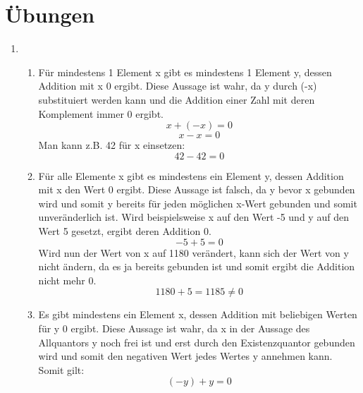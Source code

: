 \documentclass[a4paper]{article}
\begin{document}
	\section{Übungen}
	\begin{enumerate}
		\item
		\begin{enumerate}
			\item
			Für mindestens 1 Element x gibt es mindestens 1 Element y, dessen Addition mit x 0 ergibt.
			\newline
			Diese Aussage ist wahr, da y durch (-x) substituiert werden kann und die Addition einer Zahl mit deren Komplement immer 0 ergibt.
			\begin{equation*}
				x + (-x) = 0
			\end{equation*}
			\begin{equation*}
				x - x = 0
			\end{equation*}
			\newline
			Man kann z.B. 42 für x einsetzen:
			\begin{equation*}
				42 - 42 = 0
			\end{equation*}
			
			\item
			Für alle Elemente x gibt es mindestens ein Element y, dessen Addition mit x den Wert 0 ergibt.
			\newline
			Diese Aussage ist falsch, da y bevor x gebunden wird und somit y bereits für jeden möglichen x-Wert gebunden und somit unveränderlich ist.
			\newline
			Wird beispielsweise x auf den Wert -5 und y auf den Wert 5 gesetzt, ergibt deren Addition 0.
			\begin{equation*}
				-5 + 5 = 0
			\end{equation*}
			Wird nun der Wert von x auf 1180 verändert, kann sich der Wert von y nicht ändern, da es ja bereits gebunden ist und somit ergibt die Addition nicht mehr 0.
			\begin{equation*}
				1180 + 5 = 1185 \neq 0
			\end{equation*}
			
			\item
			Es gibt mindestens ein Element x, dessen Addition mit beliebigen Werten für y 0 ergibt. Diese Aussage ist wahr, da x in der Aussage des Allquantors y noch frei ist und erst durch den Existenzquantor gebunden wird und somit den negativen Wert jedes Wertes y annehmen kann. Somit gilt:
			\begin{equation*}
				(-y) + y = 0
			\end{equation*}
			

\end{enumerate}
\end{enumerate}
\end{document}
